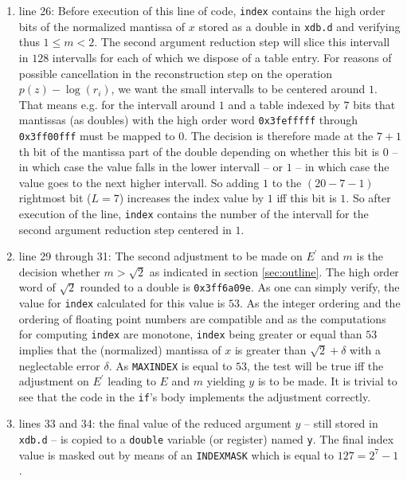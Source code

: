 {\begin{enumerate}
Rewriting {\tt xdb.i[HI] = index | 0x3ff00000} means setting the exponent of {\tt xdb} to $0$ because 
{\tt 0x3ff}$ - 1023 = 0$. 
\item line 26: Before execution of this line of code, {\tt index} contains the high order bits of the normalized mantissa
of $x$ stored as a double in {\tt xdb.d} and verifying thus $1 \leq m < 2$. The second argument reduction step
will slice this intervall in $128$ intervalls for each of which we dispose of a table entry. For reasons of possible 
cancellation in the reconstruction step on the operation $p\left( z \right) - \log\left( r_i \right)$, we want the 
small intervalls to be centered around $1$. That means e.g. for the intervall around $1$ and a table indexed by $7$ bits
that mantissas (as doubles) with the high order word {\tt 0x3fefffff} through {\tt 0x3ff00fff} must be mapped to $0$.
The decision is therefore made at the $7+1$th bit of the mantissa part of the double depending on whether this bit is $0$ 
-- in which case the value falls in the lower intervall -- or $1$ -- in which case the value goes to the next higher 
intervall. So adding $1$ to the $\left(20 - 7 - 1\right)$ rightmost bit ($L = 7$) increases the index value by $1$ iff this bit is $1$.
So after execution of the line, {\tt index} contains the number of the intervall for the second argument reduction step 
centered in $1$.
\item line 29 through 31: The second adjustment to be made on $E^\prime$ and $m$ is the decision whether $m > \sqrt{2}$ as
indicated in section \ref{sec:outline}. The high order word of $\sqrt{2}$ rounded to a double is {\tt 0x3ff6a09e}.
As one can simply verify, the value for {\tt index} calculated for this value is $53$. As the integer ordering and 
the ordering of floating point numbers are compatible and as the computations for computing {\tt index} are monotone,
{\tt index} being greater or equal than $53$ implies that the (normalized) mantissa of $x$ is greater than 
$\sqrt{2} + \delta$ with a neglectable error $\delta$. 
As {\tt MAXINDEX} is equal to $53$, the test will be true iff the adjustment on $E^\prime$ leading
to $E$ and $m$ yielding $y$ is to be made. It is trivial to see that the code in the {\tt if}'s body implements the
adjustment correctly.
\item lines 33 and 34: the final value of the reduced argument $y$ -- still stored in {\tt xdb.d} -- is copied to 
a {\tt double} variable (or register) named {\tt y}. The final index value is masked out by means of an {\tt INDEXMASK}
which is equal to $127 = 2^7-1$.

\end{enumerate}}
